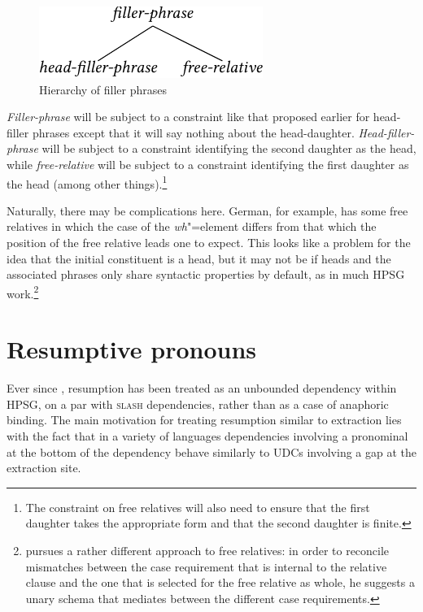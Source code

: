\documentclass[output=paper
	        ,collection
	        ,collectionchapter
 	        ,biblatex
                ,babelshorthands
                ,newtxmath
                ,draftmode
                ,colorlinks, citecolor=brown
]{langscibook}
\begin{document}
{\begin{figure}[htb]
  \includegraphics{figures/BB-filler-phrase-crop}
  \caption{\label{fig:UDC:67}Hierarchy of filler phrases}
  
\end{figure}

\noindent
\textit{Filler-phrase} will be subject to a constraint like that proposed earlier
for head-filler phrases except that it will say nothing about the
head-daughter. \textit{Head-filler-phrase} will be subject to a constraint
identifying the second daughter as the head, while \textit{free-relative} will
be subject to a constraint identifying the first daughter as the head
(among other things).\footnote{The constraint on free relatives will also
  need to ensure that the first daughter takes the appropriate form and
  that the second daughter is finite.}

Naturally, there may be complications here. German, for example, has
some free relatives in which the case of the \emph{wh}"=element differs from
that which the position of the free relative leads one to expect. This
looks like a problem for the idea that the initial constituent is a
head, but it may not be if heads and the associated phrases only share
syntactic properties by default, as in much HPSG
work.\footnote{\citet{Mueller:99a} pursues a rather different approach
  to free relatives: in order to reconcile 
mismatches between the case requirement that is internal to the relative
clause and the one that is selected for the free relative as whole,
he suggests a unary schema that mediates between the
different case requirements.  }


\section{Resumptive pronouns}
\label{sec:UDC:ResumptivePronouns}

Ever since \citet{Vaillette:01}, resumption has been treated as an unbounded dependency within HPSG, on a par with \textsc{slash} dependencies, rather than as a case of anaphoric binding. The main motivation for treating resumption similar to extraction lies with the fact that in a variety of languages dependencies involving a pronominal at the bottom of the dependency behave similarly to UDCs involving a gap at the extraction site. 

}
\end{document}
